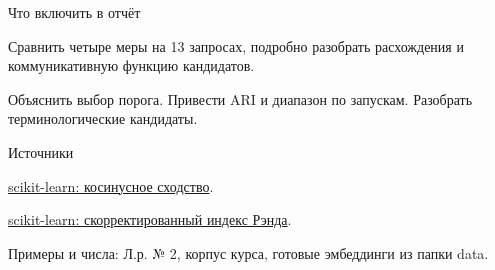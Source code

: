 \documentclass[aspectratio=169,12pt]{beamer}
\begin{document}
\begin{frame}{Что включить в отчёт}
\color{ink}
{\small Сравнить четыре меры на 13 запросах, подробно разобрать расхождения и коммуникативную функцию кандидатов.
\par\vspace{0.6em}Объяснить выбор порога. Привести ARI и диапазон по запускам. Разобрать терминологические кандидаты.}

\end{frame}
\color{ink}
\begin{frame}{Источники}
\color{ink}
{\small \href{https://scikit-learn.org/stable/modules/metrics.html\#cosine-similarity}{scikit-learn: косинусное сходство}.
\par\vspace{0.6em}\href{https://scikit-learn.org/stable/modules/generated/sklearn.metrics.adjusted_rand_score.html}{scikit-learn: скорректированный индекс Рэнда}.
\par\vspace{0.6em}Примеры и числа: Л.р. № 2, корпус курса, готовые эмбеддинги из папки data.}
\end{frame}
\end{document}
